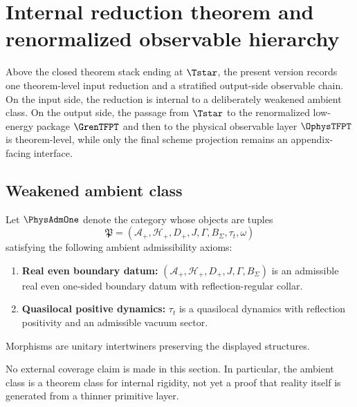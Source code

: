 \section{Internal reduction theorem and renormalized observable hierarchy}
\label{sec:universality-operational}

Above the closed theorem stack ending at $\Tstar$, the present version records one theorem-level
input reduction and a stratified output-side observable chain. On the input side, the reduction is
internal to a deliberately weakened ambient class. On the output side, the passage from $\Tstar$ to
the renormalized low-energy package $\GrenTFPT$ and then to the physical observable layer
$\OphysTFPT$ is theorem-level, while only the final scheme projection remains an appendix-facing
interface.

\subsection{Weakened ambient class}

\begin{definition}
\label{def:physadm}
Let $\PhysAdmOne$ denote the category whose objects are tuples
\[
\mathfrak P=
(\mathcal A_+,\mathcal H_+,D_+,J,\Gamma,B_\Sigma,\tau_t,\omega)
\]
satisfying the following ambient admissibility axioms:
\begin{enumerate}[leftmargin=2em, topsep=3pt, itemsep=3pt]
    \item[\textbf{(U1)}] \textbf{Real even boundary datum:}
    $(\mathcal A_+,\mathcal H_+,D_+,J,\Gamma,B_\Sigma)$ is an admissible real even one-sided
    boundary datum with reflection-regular collar.
    \item[\textbf{(U4)}] \textbf{Quasilocal positive dynamics:}
    $\tau_t$ is a quasilocal dynamics with reflection positivity and an admissible vacuum sector.
\end{enumerate}
Morphisms are unitary intertwiners preserving the displayed structures.
\end{definition}

No external coverage claim is made in this section. In particular, the ambient class is a theorem
class for internal rigidity, not yet a proof that reality itself is generated from a thinner
primitive layer.

